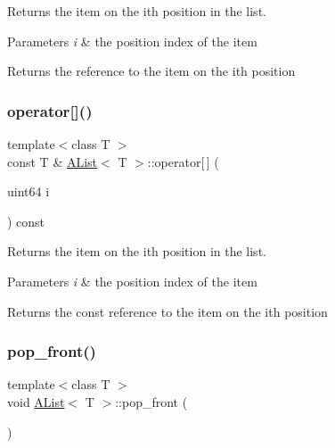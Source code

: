 Returns the item on the ith position in the list. 


\begin{DoxyParams}{Parameters}
{\em i} & the position index of the item \\
\hline
\end{DoxyParams}
\begin{DoxyReturn}{Returns}
the reference to the item on the ith position 
\end{DoxyReturn}
\mbox{\label{class_a_list_a6bbd9c13506077c05b29f32a7fd0a4cf}} 
\subsubsection{\texorpdfstring{operator[]()}{operator[]()}\hspace{0.1cm}{\footnotesize\ttfamily [2/2]}}
{\footnotesize\ttfamily template$<$class T $>$ \\
const T \& \mbox{\hyperlink{class_a_list}{A\+List}}$<$ T $>$\+::operator\mbox{[}$\,$\mbox{]} (\begin{DoxyParamCaption}\item[{uint64}]{i }\end{DoxyParamCaption}) const\hspace{0.3cm}{\ttfamily [inline]}}



Returns the item on the ith position in the list. 


\begin{DoxyParams}{Parameters}
{\em i} & the position index of the item \\
\hline
\end{DoxyParams}
\begin{DoxyReturn}{Returns}
the const reference to the item on the ith position 
\end{DoxyReturn}
\mbox{\label{class_a_list_a2240edc5f38fa7e57a868bb30b747c51}} 
\subsubsection{\texorpdfstring{pop\_front()}{pop\_front()}}
{\footnotesize\ttfamily template$<$class T $>$ \\
void \mbox{\hyperlink{class_a_list}{A\+List}}$<$ T $>$\+::pop\+\_\+front (\begin{DoxyParamCaption}{ }\end{DoxyParamCaption})}



